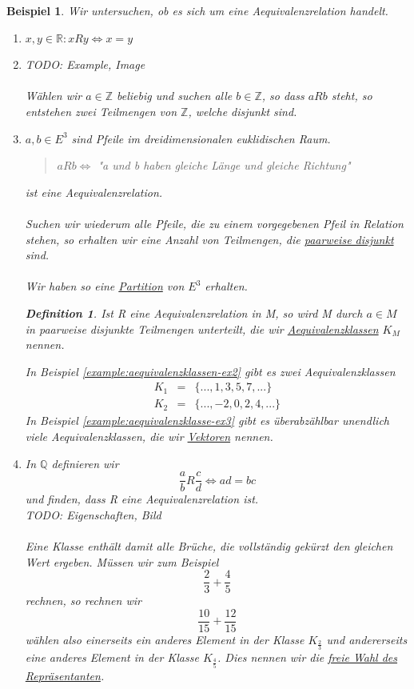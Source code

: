 \documentclass{report}
\newtheorem{mydef}{Definition}
\newtheorem{myexample}{Beispiel}
\begin{document}
\begin{myexample}Wir untersuchen, ob es sich um eine Aequivalenzrelation handelt.
\begin{enumerate}\item $x,y \in \mathbb{R} : x R y \iff x = y$
\item \label{example:aequivalenzklassen-ex2}
TODO: Example, Image\\\\
Wählen wir $a \in \mathbb{Z}$ beliebig und suchen alle $b \in \mathbb{Z}$, so dass $a R b$ steht, so entstehen zwei Teilmengen von $\mathbb{Z}$, welche disjunkt sind.
\item \label{example:aequivalenzklasse-ex3}$a, b \in E^3$ sind Pfeile im dreidimensionalen euklidischen Raum.
\begin{quote}$a R b \iff $ "a und b haben gleiche Länge und gleiche Richtung"\end{quote}
ist eine Aequivalenzrelation.\\\\
Suchen wir wiederum alle Pfeile, die zu einem vorgegebenen Pfeil in Relation stehen, so erhalten wir eine Anzahl von Teilmengen, die \underline{paarweise disjunkt} sind.\\\\
Wir haben so eine \underline{Partition} von $E^3$ erhalten.
\begin{mydef}Ist R eine Aequivalenzrelation in M, so wird M durch $a \in M$ in paarweise disjunkte Teilmengen unterteilt, die wir \underline{Aequivalenzklassen} $K_M$ nennen.\end{mydef}
In Beispiel \ref{example:aequivalenzklassen-ex2} gibt es zwei Aequivalenzklassen
\begin{eqnarray}K_1 & = & \{..., 1,3,5,7,...\} \nonumber \\
K_2 & = & \{..., -2, 0, 2, 4, ...\}\end{eqnarray}
In Beispiel \ref{example:aequivalenzklasse-ex3} gibt es überabzählbar unendlich viele Aequivalenzklassen, die wir \underline{Vektoren} nennen.
\item In $\mathbb{Q}$ definieren wir
\begin{equation}\frac{a}{b} R \frac{c}{d} \iff ad = bc\end{equation}
und finden, dass R eine Aequivalenzrelation ist.\\
TODO: Eigenschaften, Bild\\\\
Eine Klasse enthält damit alle Brüche, die vollständig gekürzt den gleichen Wert ergeben. Müssen wir zum Beispiel
\begin{equation}\frac{2}{3} + \frac{4}{5}\end{equation}
rechnen, so rechnen wir
\begin{equation}\frac{10}{15} + \frac{12}{15}\end{equation}
wählen also einerseits ein anderes Element in der Klasse $K_\frac{2}{3}$ und andererseits eine anderes Element in der Klasse $K_\frac{4}{5}$. Dies nennen wir die \underline{freie Wahl des Repräsentanten}.
\end{enumerate}\end{myexample}
\end{document}
